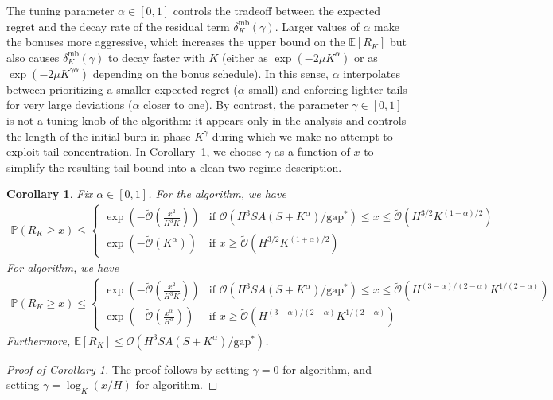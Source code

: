 \documentclass[11pt]{article}
\newcommand{\E} {\mathbb{E}}
\newcommand{\PP}{\mathbb{P}}
\newcommand{\KD} {\texttt{KD}}
\newcommand{\KI} {\texttt{KI}}
\newtheorem{cor}{Corollary}
\newcommand{\gapstar}{\mathrm{gap}^*}
\begin{document}
The tuning parameter $\alpha\in[0,1]$ controls the tradeoff between the expected regret and the decay rate of the residual term $\delta_K^{\mathrm{mb}}(\gamma)$. Larger values of $\alpha$ make the bonuses more aggressive, which increases the upper bound on the $\mathbb E[R_K]$ but also causes $\delta_K^{\mathrm{mb}}(\gamma)$ to decay faster with $K$ (either as $\exp(-2\mu K^\alpha)$ or as $\exp(-2\mu K^{\gamma\alpha})$ depending on the bonus schedule). In this sense, $\alpha$ interpolates between prioritizing a smaller expected regret ($\alpha$ small) and enforcing lighter tails for very large deviations ($\alpha$ closer to one). By contrast, the parameter $\gamma\in[0,1]$ is not a tuning knob of the algorithm: it appears only in the analysis and controls the length of the initial burn-in phase $K^\gamma$ during which we make no attempt to exploit tail concentration. In Corollary~\ref{cor:tailExpBound-UCBVI}, we choose $\gamma$ as a function of $x$ to simplify the resulting tail bound into a clean two-regime description.

\begin{cor}\label{cor:tailExpBound-UCBVI}
 Fix $\alpha\in[0,1]$. For the \text{\KD} algorithm, we have
    \begin{align*}
    \PP(R_K\geq x)\leq\begin{cases}
        \exp\left(-\tilde{\mathcal{O}}\left(\frac{x^2}{H^3K}\right)\right)  & \text{if } \mathcal{O}(H^3SA(S+K^\alpha)/\gapstar)\leq x \leq \tilde{\mathcal{O}}(H^{3/2}K^{(1+\alpha)/2})\\
        \exp\left(-\tilde{\mathcal{O}}\left( K^\alpha \right)\right) & \text{if }  x \geq \tilde{\mathcal{O}}(H^{3/2}K^{(1+\alpha)/2})
    \end{cases}
    \end{align*}
    For \text{\KI} algorithm, we have
    \begin{align*}
    \PP(R_K\geq x)\leq\begin{cases}
        \exp\left(-\tilde{\mathcal{O}}\left(\frac{x^2}{H^3K}\right)\right)  & \text{if } \mathcal{O}(H^3SA(S+K^\alpha)/\gapstar)\leq x \leq \tilde{\mathcal{O}}(H^{(3-\alpha)/(2-\alpha)}K^{1/(2-\alpha)})\\
        \exp\left(-\tilde{\mathcal{O}}\left( \frac{x^\alpha}{H^\alpha} \right)\right) & \text{if }  x \geq \tilde{\mathcal{O}}(H^{(3-\alpha)/(2-\alpha)}K^{1/(2-\alpha)})
    \end{cases}
    \end{align*}
    Furthermore, $\E[R_K] \leq \mathcal{O}(H^3SA(S+K^\alpha)/\gapstar)$.
\end{cor}
\begin{proof}[Proof of Corollary \ref{cor:tailExpBound-UCBVI}]
    The proof follows by setting $\gamma = 0$ for \text{\KD} algorithm, and setting $\gamma=\log_K(x/H)$ for \text{\KI} algorithm.
\end{proof}
\end{document}
